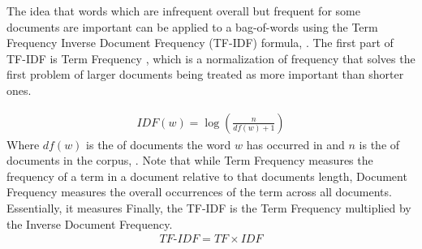 The idea that words which are infrequent overall but frequent for some documents are important can be applied to a bag-of-words using the Term Frequency Inverse Document Frequency (TF-IDF) formula, . The first part of TF-IDF is Term Frequency , which is a normalization of frequency that solves the first problem of larger documents being treated as more important than shorter ones. 

\begin{equation}
\begin{align*}
\textit{IDF}(w) =  \log({\frac{n}{{df}(w) + 1} })
\end{align*}
\end{equation}
Where ${df}(w)$ is the  of documents the word $w$ has occurred in and $n$ is the  of documents in the corpus, . Note that while Term Frequency measures the frequency of a term in a document relative to that documents length, Document Frequency measures the overall occurrences of the term across all documents. Essentially, it measures    Finally, the TF-IDF is the Term Frequency multiplied by the Inverse Document Frequency.
\begin{equation}
\begin{align*}
\textit{TF-IDF} = \textit{TF} \times \textit{IDF}
\end{align*}
\end{equation}

